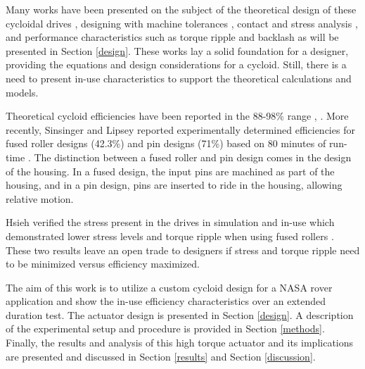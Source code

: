 Many works have been presented on the subject of the theoretical design of these cycloidal drives \cite{on_the_lobe} \cite{hwang_hsieh}, designing with machine tolerances \cite{design_and_application}, contact and stress analysis \cite{li}, and performance characteristics such as torque ripple and backlash \cite{hsieh_traditional} \cite{hsieh_dynamics} as will be presented in Section \ref{design}.
These works lay a solid foundation for a designer, providing the equations and design considerations for a cycloid.
Still, there is a need to present in-use characteristics to support the theoretical calculations and models.


Theoretical cycloid efficiencies have been reported in the 88-98\% range \cite{Malhorta}, \cite{unified_approach}.
More recently, Sinsinger and Lipsey reported experimentally determined efficiencies for fused roller designs (42.3\%) and pin designs (71\%) based on 80 minutes of run-time \cite{cycloid_vs_harmonic}.
The distinction between a fused roller and pin design comes in the design of the housing.
In a fused design, the input pins are machined as part of the housing, and in a pin design, pins are inserted to ride in the housing, allowing relative motion.

Hsieh verified the stress present in the drives in simulation and in-use which demonstrated lower stress levels and torque ripple when using fused rollers \cite{hsieh_dynamics}.
These two results leave an open trade to designers if stress and torque ripple need to be minimized versus efficiency maximized.

The aim of this work is to utilize a custom cycloid design for a NASA rover application and show the in-use efficiency characteristics over an extended duration test.
The actuator design is presented in Section \ref{design}.
A description of the experimental setup and procedure is provided in Section \ref{methods}.
Finally, the results and analysis of this high torque actuator and its implications are presented and discussed in Section \ref{results} and Section \ref{discussion}.

